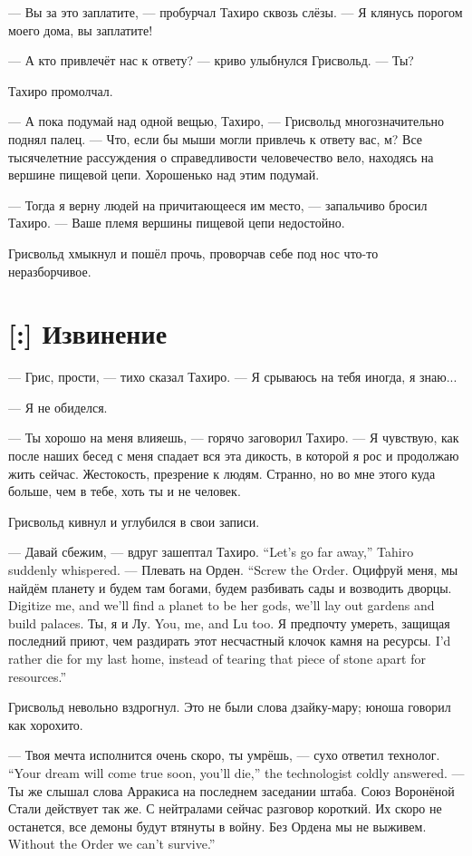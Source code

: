 --- Вы за это заплатите, --- пробурчал Тахиро сквозь слёзы.
--- Я клянусь порогом моего дома, вы заплатите!

--- А кто привлечёт нас к ответу? --- криво улыбнулся Грисвольд.
--- Ты?

Тахиро промолчал.

--- А пока подумай над одной вещью, Тахиро, --- Грисвольд многозначительно поднял палец.
--- Что, если бы мыши могли привлечь к ответу вас, м?
Все тысячелетние рассуждения о справедливости человечество вело, находясь на вершине пищевой цепи.
Хорошенько над этим подумай.

--- Тогда я верну людей на причитающееся им место, --- запальчиво бросил Тахиро.
--- Ваше племя вершины пищевой цепи недостойно.

Грисвольд хмыкнул и пошёл прочь, проворчав себе под нос что-то неразборчивое.

\section{[:] Извинение}

\textspace

--- Грис, прости, --- тихо сказал Тахиро.
--- Я срываюсь на тебя иногда, я знаю...

--- Я не обиделся.

--- Ты хорошо на меня влияешь, --- горячо заговорил Тахиро.
--- Я чувствую, как после наших бесед с меня спадает вся эта дикость, в которой я рос и продолжаю жить сейчас.
Жестокость, презрение к людям.
Странно, но во мне этого куда больше, чем в тебе, хоть ты и не человек.

Грисвольд кивнул и углубился в свои записи.

{--- Давай сбежим, --- вдруг зашептал Тахиро.}
{``Let's go far away,'' Tahiro suddenly whispered.}
{--- Плевать на Орден.}
{``Screw the Order.}
{Оцифруй меня, мы найдём планету и будем там богами, будем разбивать сады и возводить дворцы.}
{Digitize me, and we'll find a planet to be her gods, we'll lay out gardens and build palaces.}
{Ты, я и Лу.}
{You, me, and Lu too.}
{Я предпочту умереть, защищая последний приют, чем раздирать этот несчастный клочок камня на ресурсы.}
{I'd rather die for my last home, instead of tearing that piece of stone apart for resources.''}

Грисвольд невольно вздрогнул.
Это не были слова дзайку-мару;
юноша говорил как хорохито.

{--- Твоя мечта исполнится очень скоро, ты умрёшь, --- сухо ответил технолог.}
{``Your dream will come true soon, you'll die,'' the technologist coldly answered.}
--- Ты же слышал слова Арракиса на последнем заседании штаба.
Союз Воронёной Стали действует так же.
С нейтралами сейчас разговор короткий.
Их скоро не останется, все демоны будут втянуты в войну.
{Без Ордена мы не выживем.}
{Without the Order we can't survive.''}

